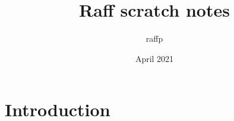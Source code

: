 \documentclass{article}
\title{Raff scratch notes}
\author{raffp }
\date{April 2021}
\begin{document}
\maketitle

\section{Introduction}
\end{document}
